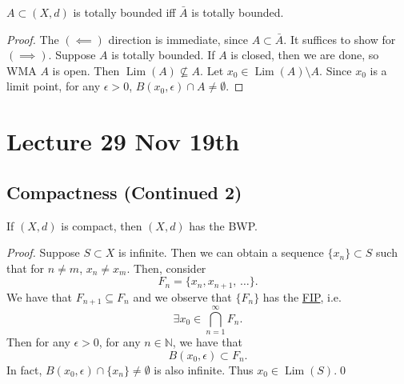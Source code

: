 \documentclass[notoc,notitlepage]{tufte-book}
\DeclareMathOperator{\Lim}{Lim }
\begin{document}
\begin{propo}\label{propo:a_set_is_totally_bounded_iff_its_closure_is_totally_bounded}
  $A \subset (X, d)$ is totally bounded iff $\bar{A}$ is totally bounded.
\end{propo}
\begin{proof}
  The $(\impliedby)$ direction is immediate, since $A \subset \bar{A}$. It suffices to show for $(\implies)$. Suppose $A$ is totally bounded. If $A$ is closed, then we are done, so WMA $A$ is open. Then $\Lim(A) \nsubseteq A$. Let $x_0 \in \Lim(A) \setminus A$. Since $x_0$ is a limit point, for any $\epsilon > 0$, $B(x_0, \epsilon) \cap A \neq \emptyset$. 
\end{proof}



\chapter{Lecture 29 Nov 19th}%
\label{chp:lecture_29_nov_19th}

\section{Compactness (Continued 2)}%
\label{sec:compactness_continued_2}

\begin{thm}\label{thm:compact_sets_have_bwp}
  If $(X, d)$ is compact, then $(X, d)$ has the BWP.
\end{thm}

\begin{proof}
  Suppose $S \subset X$ is infinite. Then we can obtain a sequence $\{ x_n \} \subset S$ such that for $n \neq m$, $x_n \neq x_m$. Then, consider
  \begin{equation*}
    F_n = \{ x_n, x_{n + 1}, \, \ldots \}.
  \end{equation*}
  We have that $F_{n + 1} \subseteq F_n$ and we observe that $\{ F_n \}$ has the \hyperref[defn:finite_intersection_property]{FIP},  i.e.
  \begin{equation*}
    \exists x_0 \in \bigcap_{n = 1}^{\infty} F_n.
  \end{equation*}
  Then for any $\epsilon > 0$, for any $n \in \mathbb{N}$, we have that
  \begin{equation*}
    B(x_0, \epsilon) \subset F_n.
  \end{equation*}
  In fact, $B(x_0, \epsilon) \cap \{ x_n \} \neq \emptyset$ is also infinite. Thus $x_0 \in \Lim(S)$.\qed\
\end{proof}
\end{document}
